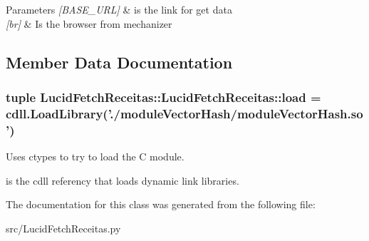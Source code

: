 \begin{DoxyParams}{Parameters}
{\em \mbox{[}BASE\_\-URL\mbox{]}} & is the link for get data \\
\hline
{\em \mbox{[}br\mbox{]}} & Is the browser from mechanizer \\
\hline
\end{DoxyParams}


\subsection{Member Data Documentation}
\hypertarget{classLucidFetchReceitas_1_1LucidFetchReceitas_afde7b36b1c1f6e43cf550042e9219d81}{
\subsubsection[{load}]{\setlength{\rightskip}{0pt plus 5cm}tuple LucidFetchReceitas::LucidFetchReceitas::load = cdll.LoadLibrary('./moduleVectorHash/moduleVectorHash.so')}}
\label{classLucidFetchReceitas_1_1LucidFetchReceitas_afde7b36b1c1f6e43cf550042e9219d81}


Uses ctypes to try to load the C module. 

is the cdll referency that loads dynamic link libraries. 

The documentation for this class was generated from the following file:\begin{DoxyCompactItemize}
\item 
src/LucidFetchReceitas.py\end{DoxyCompactItemize}
